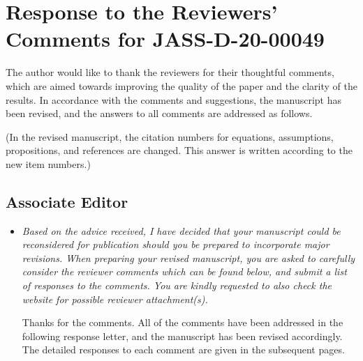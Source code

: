 \documentclass[11pt]{article}
\newcommand{\comment}[1]{\item \itshape #1 \normalfont}
\begin{document}

\section*{Response to the Reviewers' Comments for JASS-D-20-00049}

The author would like to thank the reviewers for their thoughtful comments, which are aimed towards improving the quality of the paper and the clarity of the results.
In accordance with the comments and suggestions, the manuscript has been revised, and the answers to all comments are addressed as follows.

(In the revised manuscript, the citation numbers for equations, assumptions, propositions, and references are changed. This answer is written according to the new item numbers.)

\subsection*{Associate Editor}

\setlength{\leftmargini}{0pt}
\begin{itemize}\setlength{\itemsep}{2\parsep}

\comment{
    Based on the advice received, I have decided that your manuscript could be reconsidered for publication should you be prepared to incorporate major revisions. 
    When preparing your revised manuscript, you are asked to carefully consider the reviewer comments which can be found below, and submit a list of responses to the comments. 
    You are kindly requested to also check the website for possible reviewer attachment(s).
}

Thanks for the comments. All of the comments have been addressed in the following response letter, and the manuscript has been revised accordingly. 
The detailed responses to each comment are given in the subsequent pages.  

\end{itemize}

\clearpage\newpage
\end{document}

